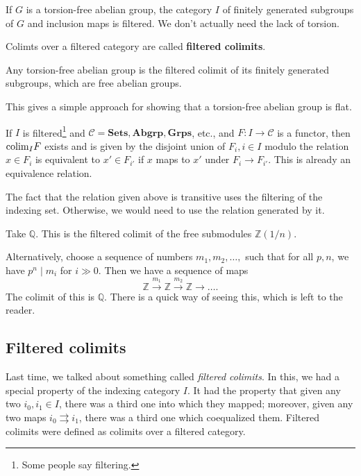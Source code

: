 \begin{example} 
If $G$ is a torsion-free abelian group, the category $I$ of finitely generated
subgroups of $G$ and inclusion maps is filtered. We don't actually need the
lack of torsion. 
\end{example} 

\begin{definition} 
Colimts over a filtered category are called \textbf{filtered colimits}.
\end{definition} 

\begin{example} 
Any torsion-free abelian group is the filtered colimit of its finitely
generated subgroups, which are free abelian groups.  
\end{example} 
This gives a simple approach for showing that a torsion-free abelian group is
flat.

\begin{proposition} 
If $I$ is filtered\footnote{Some people say filtering.} and $\mathcal{C} =
\mathbf{Sets}, \mathbf{Abgrp}, \mathbf{Grps}$, etc., and $F: I \to \mathcal{C}$
is a functor, then $\mathrm{colim}_I F$ exists and is given by the disjoint union of
$F_i, i \in I$ modulo the relation $x \in F_i$ is equivalent to $x' \in F_{i'}$
if $x$ maps to $x'$ under $F_i \to F_{i'}$. This is already an equivalence
relation. 
\end{proposition} 

The fact that the relation given above is transitive uses the filtering of the
indexing set. Otherwise, we would need to use the relation generated by it. 

\begin{example} 
Take $\mathbb{Q}$. This is the filtered colimit of the free submodules
$\mathbb{Z}(1/n)$.

Alternatively, choose a sequence of numbers $m_1 , m_2, \dots, $ such that for
all $p, n$, we have $p^n \mid m_i$ for $i \gg 0$. Then we have a sequence of
maps
\[ \mathbb{Z} \stackrel{m_1}{\to} \mathbb{Z} \stackrel{m_2}{\to}\mathbb{Z}
\to \dots.   \]
The colimit of this is $\mathbb{Q}$. There is a quick way of seeing this, which
is left to the reader.
\end{example} 

\subsection{Filtered colimits}
Last time, we talked about something called \emph{filtered colimits}. In this,
we had a special property of the indexing category $I$. It had the property
that given any two $i_0, i_1 \in I$, there was a third one into which they
mapped; moreover, given any two maps $i_0 \rightrightarrows i_1$, there was a
third one which coequalized them. Filtered colimits were defined as colimits
over a filtered category. 

